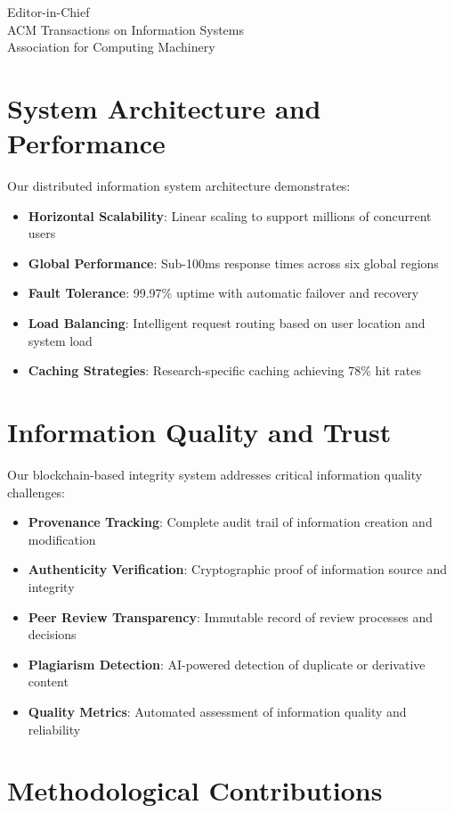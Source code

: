 \documentclass[11pt]{letter}
\begin{document}
\begin{letter}{Editor-in-Chief\\
ACM Transactions on Information Systems\\
Association for Computing Machinery}
\section*{System Architecture and Performance}

Our distributed information system architecture demonstrates:

\begin{itemize}
    \item \textbf{Horizontal Scalability}: Linear scaling to support millions of concurrent users
    \item \textbf{Global Performance}: Sub-100ms response times across six global regions
    \item \textbf{Fault Tolerance}: 99.97\% uptime with automatic failover and recovery
    \item \textbf{Load Balancing}: Intelligent request routing based on user location and system load
    \item \textbf{Caching Strategies}: Research-specific caching achieving 78\% hit rates
\end{itemize}

\section*{Information Quality and Trust}

Our blockchain-based integrity system addresses critical information quality challenges:

\begin{itemize}
    \item \textbf{Provenance Tracking}: Complete audit trail of information creation and modification
    \item \textbf{Authenticity Verification}: Cryptographic proof of information source and integrity
    \item \textbf{Peer Review Transparency}: Immutable record of review processes and decisions
    \item \textbf{Plagiarism Detection}: AI-powered detection of duplicate or derivative content
    \item \textbf{Quality Metrics}: Automated assessment of information quality and reliability
\end{itemize}

\section*{Methodological Contributions}


\end{letter}
\end{document}
